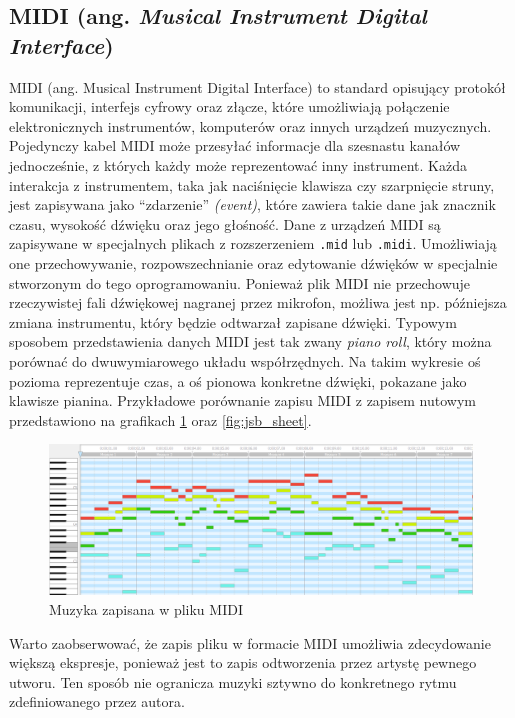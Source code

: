 \documentclass[data-science]{agh-wi} %
\begin{document}
\subsection{MIDI (ang. \textit{Musical Instrument Digital Interface})}
MIDI (ang. Musical Instrument Digital Interface) to standard opisujący protokół komunikacji, interfejs cyfrowy oraz złącze, które umożliwiają połączenie elektronicznych instrumentów, komputerów oraz innych urządzeń muzycznych. Pojedynczy kabel MIDI może przesyłać informacje dla szesnastu kanałów jednocześnie, z których każdy może reprezentować inny instrument. Każda interakcja z instrumentem, taka jak naciśnięcie klawisza czy szarpnięcie struny, jest zapisywana jako ``zdarzenie'' \textit{(event)}, które zawiera takie dane jak znacznik czasu, wysokość dźwięku oraz jego głośność. Dane z urządzeń MIDI są zapisywane w specjalnych plikach z rozszerzeniem \texttt{.mid} lub \texttt{.midi}. Umożliwiają one przechowywanie, rozpowszechnianie oraz edytowanie dźwięków w specjalnie stworzonym do tego oprogramowaniu. Ponieważ plik MIDI nie przechowuje rzeczywistej fali dźwiękowej nagranej przez mikrofon, możliwa jest np. późniejsza zmiana instrumentu, który będzie odtwarzał zapisane dźwięki. Typowym sposobem przedstawienia danych MIDI jest tak zwany \textit{piano roll}, który można porównać do dwuwymiarowego układu współrzędnych. Na takim wykresie oś pozioma reprezentuje czas, a oś pionowa konkretne dźwięki, pokazane jako klawisze pianina. Przykładowe porównanie zapisu MIDI z zapisem nutowym przedstawiono na grafikach \ref*{fig:jsb_pianoroll} oraz \ref*{fig:jsb_sheet}.

\begin{figure}[ht!]
    \begin{center}
        \includegraphics*[width=\linewidth]{./img/piano_roll.png}
    \end{center}
    \caption{Muzyka zapisana w pliku MIDI}\label{fig:jsb_pianoroll}
\end{figure}

Warto zaobserwować, że zapis pliku w formacie MIDI umożliwia zdecydowanie większą ekspresje, ponieważ jest to zapis odtworzenia przez artystę pewnego utworu. Ten sposób nie ogranicza muzyki sztywno do konkretnego rytmu zdefiniowanego przez autora.
\end{document}
